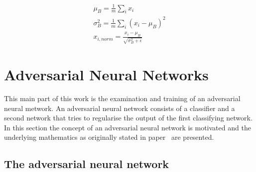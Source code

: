 \begin{align}
    \mu_B = \frac{1}{m} \sum_i x_i\\
    \sigma_B^2 = \frac{1}{m} \sum_i (x_i - \mu_B)^2\\
    x_{i,norm} = \frac{x_i - \mu_B}{\sqrt{\sigma_B^2 + \epsilon}}
\end{align}





\section{Adversarial Neural Networks}

This main part of this work is the examination and training of an adversarial neural metwork. An adversarial neural network consists of a classifier and a second network that tries to regularise the output of the first classifying network.\\
In this section the concept of an adversarial neural network is motivated and the underlying mathematics as originally stated in paper~\cite{2014arXiv1406.2661G} are presented.

\subsection{The adversarial neural network}

